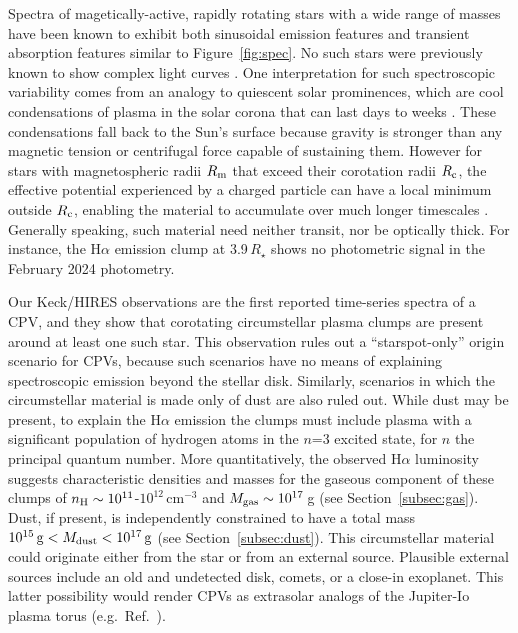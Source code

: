 \documentclass{nature3}
\begin{document}
Spectra of magetically-active, rapidly rotating stars with a wide range
of masses have been known to exhibit both sinusoidal emission features
\cite{Donati2000,Townsend2005,Dunstone2006,Skelly2008} and
transient absorption features
\cite{CollierCameron1989,CollierCameron1992,Cang2020} similar to
Figure~\ref{fig:spec}.  No such stars were previously known to show
complex light curves \cite{Bouma2024}.   One interpretation for
such spectroscopic variability comes from an analogy to quiescent solar
prominences, which are cool condensations of plasma in the solar corona
that can last days to weeks \cite{VialEngvold2015}.  These
condensations fall back to the Sun's surface because gravity is
stronger than any magnetic tension or centrifugal force capable of
sustaining them.  However for stars with magnetospheric radii $R_{\rm
m}$ that exceed their corotation radii $R_{\rm c}$, the effective
potential experienced by a charged particle can have a local minimum
outside $R_{\rm c}$, enabling the material to accumulate over much
longer timescales \cite{Petit2013,Daley-Yates2024}.  Generally
speaking, such material need neither transit, nor be optically thick.
For instance, the H$\alpha$ emission clump at 3.9\,$R_\star$ shows no 
photometric signal in the February 2024 photometry.

Our Keck/HIRES observations are the first reported time-series spectra
of a CPV, and they show that corotating circumstellar plasma clumps
are present around at least one such star.  This observation rules out
a ``starspot-only'' origin scenario for CPVs, \cite{Koen2021} because
such scenarios have no means of explaining spectroscopic emission
beyond the stellar disk.  Similarly, scenarios in which the
circumstellar material is made only of dust are also ruled out.  While
dust may be present, to explain the H$\alpha$ emission the clumps must
include plasma with a significant population of hydrogen atoms in the
$n$=3 excited state, for $n$ the principal quantum number.  More quantitatively, the observed H$\alpha$
luminosity suggests characteristic densities and masses for the
gaseous component of these clumps of $n_{\rm H} \sim
10^{11}$-$10^{12}$\,cm$^{-3}$ and $M_{\rm gas} \sim 10^{17}$\,g (see
Section~\ref{subsec:gas}).  Dust, if present, is independently
constrained to have a total mass $10^{15}\,{\rm g} < M_{\rm dust} <
10^{17}\,{\rm g}$ (see Section~\ref{subsec:dust}).  This circumstellar
material could originate either from the star or from an external
source.  Plausible external sources include an old and undetected
disk, comets, or a close-in exoplanet.
This latter possibility would render CPVs as extrasolar analogs of the
Jupiter-Io plasma torus (e.g.~Ref.~\cite{Bagenal1981}).
\end{document}
